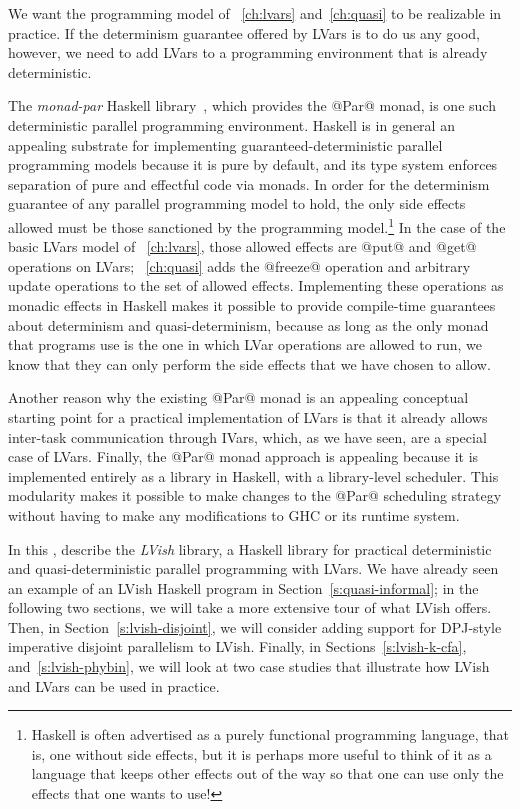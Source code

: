We want the programming model of ~\ref{ch:lvars}
and~\ref{ch:quasi} to be realizable in practice.  If the determinism
guarantee offered by LVars is to do us any good, however, we need to
add LVars to a programming environment that is already deterministic.

The \emph{monad-par} Haskell library~\cite{monad-par}, which provides
the @Par@ monad, is one such deterministic parallel programming
environment.  Haskell is in general an appealing substrate for
implementing guaranteed-deterministic parallel programming models
because it is pure by default, and its type system enforces separation
of pure and effectful code via monads.  In order for the determinism
guarantee of any parallel programming model to hold, the only side
effects allowed must be those sanctioned by the programming
model.\footnote{Haskell is often advertised as a purely functional
programming language, that is, one without side effects, but it is
perhaps more useful to think of it as a language that keeps other
effects out of the way so that one can use only the effects that one
wants to use!}  In the case of the basic LVars model
of ~\ref{ch:lvars}, those allowed effects are
@put@ and @get@ operations on
LVars; ~\ref{ch:quasi} adds the @freeze@
operation and arbitrary update operations to the set of allowed
effects.  Implementing these operations as monadic effects in Haskell
makes it possible to provide compile-time guarantees about determinism
and quasi-determinism, because as long as the only monad that programs
use is the one in which LVar operations are allowed to run, we know
that they can only perform the side effects that we have chosen to
allow.

Another reason why the existing @Par@ monad is an appealing conceptual
starting point for a practical implementation of LVars is that it
already allows inter-task communication through IVars, which, as we
have seen, are a special case of LVars.  Finally, the @Par@ monad
approach is appealing because it is implemented entirely as a library
in Haskell, with a library-level scheduler.  This modularity makes it
possible to make changes to the @Par@ scheduling strategy without
having to make any modifications to GHC or its runtime system.

In this ,  describe
the \emph{LVish} library, a Haskell library for practical
deterministic and quasi-deterministic parallel programming with LVars.
We have already seen an example of an LVish Haskell program in
Section~\ref{s:quasi-informal}; in the following two sections, we will
take a more extensive tour of what LVish offers.  Then, in
Section~\ref{s:lvish-disjoint}, we will consider adding support for
DPJ-style imperative disjoint parallelism to LVish.  Finally, in
Sections~\ref{s:lvish-k-cfa}, and~\ref{s:lvish-phybin}, we will look
at two case studies that illustrate how LVish and LVars can be used in
practice.
